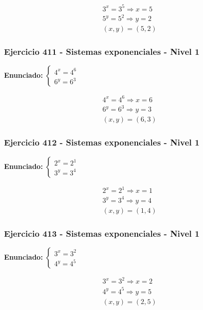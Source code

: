 \documentclass[12pt,a4paper]{article}
\begin{document}
\[
\begin{aligned}
3^x=3^{5}\Rightarrow x=5\\
5^y=5^{2}\Rightarrow y=2\\
\boxed{(x,y)=(5,2)}
\end{aligned}
\]


\subsubsection*{Ejercicio 411 - Sistemas exponenciales - Nivel 1}
\textbf{Enunciado:} \(\begin{cases} 4^x=4^{6}\\ 6^y=6^{3}\end{cases}\)

\[
\begin{aligned}
4^x=4^{6}\Rightarrow x=6\\
6^y=6^{3}\Rightarrow y=3\\
\boxed{(x,y)=(6,3)}
\end{aligned}
\]


\subsubsection*{Ejercicio 412 - Sistemas exponenciales - Nivel 1}
\textbf{Enunciado:} \(\begin{cases} 2^x=2^{1}\\ 3^y=3^{4}\end{cases}\)

\[
\begin{aligned}
2^x=2^{1}\Rightarrow x=1\\
3^y=3^{4}\Rightarrow y=4\\
\boxed{(x,y)=(1,4)}
\end{aligned}
\]


\subsubsection*{Ejercicio 413 - Sistemas exponenciales - Nivel 1}
\textbf{Enunciado:} \(\begin{cases} 3^x=3^{2}\\ 4^y=4^{5}\end{cases}\)

\[
\begin{aligned}
3^x=3^{2}\Rightarrow x=2\\
4^y=4^{5}\Rightarrow y=5\\
\boxed{(x,y)=(2,5)}
\end{aligned}
\]
\end{document}
